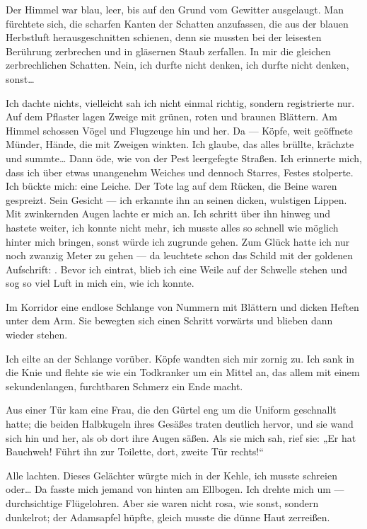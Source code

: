 Der Himmel war blau, leer, bis auf
den Grund vom Gewitter ausgelaugt. Man fürchtete sich, die scharfen
Kanten der Schatten anzufassen, die aus der blauen Herbstluft
herausgeschnitten schienen, denn sie mussten
bei der leisesten Berührung zerbrechen und in gläsernen Staub
zerfallen. In mir die gleichen zerbrechlichen Schatten. Nein, ich
durfte nicht denken, ich durfte nicht denken, sonst\ldots{}

Ich dachte nichts, vielleicht sah ich nicht einmal richtig, sondern
registrierte nur. Auf dem Pflaster lagen Zweige mit grünen, roten
und braunen Blättern. Am Himmel schossen Vögel und Flugzeuge hin
und her. Da — Köpfe, weit geöffnete Münder, Hände, die mit Zweigen
winkten. Ich glaube, das alles brüllte, krächzte und summte\ldots{} Dann
öde, wie von der Pest leergefegte Straßen. Ich erinnerte mich, dass
ich über etwas unangenehm Weiches und dennoch Starres, Festes
stolperte. Ich bückte mich: eine Leiche. Der Tote lag auf dem
Rücken, die Beine waren gespreizt. Sein Gesicht — ich erkannte ihn
an seinen dicken, wulstigen Lippen. Mit zwinkernden Augen lachte er
mich an. Ich schritt über ihn hinweg und hastete weiter, ich konnte
nicht mehr, ich musste alles so schnell wie möglich hinter mich
bringen, sonst würde ich zugrunde gehen. Zum Glück hatte ich nur
noch zwanzig Meter zu gehen — da leuchtete schon das Schild mit der
goldenen Aufschrift: . Bevor ich eintrat, blieb ich eine
Weile auf der Schwelle stehen und sog so viel Luft in mich ein, wie
ich konnte.

Im Korridor eine endlose Schlange von Nummern mit Blättern und
dicken Heften unter dem Arm. Sie bewegten sich einen Schritt
vorwärts und blieben dann wieder stehen.

Ich eilte an der Schlange vorüber. Köpfe wandten sich mir zornig
zu. Ich sank in die Knie und flehte sie wie ein Todkranker um ein
Mittel an, das allem mit einem sekundenlangen, furchtbaren Schmerz
ein Ende macht.

Aus einer Tür kam eine Frau, die den Gürtel eng um
die Uniform geschnallt hatte; die beiden Halbkugeln ihres Gesäßes
traten deutlich hervor, und sie wand sich hin und her, als ob dort
ihre Augen säßen. Als sie mich sah, rief sie: „Er hat Bauchweh!
Führt ihn zur Toilette, dort, zweite Tür rechts!“

Alle lachten. Dieses Gelächter würgte mich in der Kehle, ich musste
schreien oder\ldots{} Da fasste mich jemand von hinten am Ellbogen. Ich
drehte mich um — durchsichtige Flügelohren. Aber sie waren nicht
rosa, wie sonst, sondern dunkelrot; der Adamsapfel hüpfte, gleich
musste die dünne Haut zerreißen.

